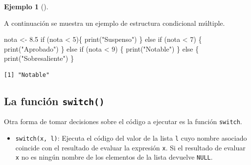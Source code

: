 \documentclass[
  a4paper,
]{scrreport}
\newenvironment{Shaded}{\begin{snugshade}}{\end{snugshade}}
\newcommand{\ControlFlowTok}[1]{\textcolor[rgb]{0.00,0.23,0.31}{#1}}
\newcommand{\DecValTok}[1]{\textcolor[rgb]{0.68,0.00,0.00}{#1}}
\newcommand{\FloatTok}[1]{\textcolor[rgb]{0.68,0.00,0.00}{#1}}
\newcommand{\FunctionTok}[1]{\textcolor[rgb]{0.28,0.35,0.67}{#1}}
\newcommand{\NormalTok}[1]{\textcolor[rgb]{0.00,0.23,0.31}{#1}}
\newcommand{\OtherTok}[1]{\textcolor[rgb]{0.00,0.23,0.31}{#1}}
\newcommand{\SpecialCharTok}[1]{\textcolor[rgb]{0.37,0.37,0.37}{#1}}
\newcommand{\StringTok}[1]{\textcolor[rgb]{0.13,0.47,0.30}{#1}}
\providecommand{\tightlist}{%
  \setlength{\itemsep}{0pt}\setlength{\parskip}{0pt}}\usepackage{longtable,booktabs,array}
\theoremstyle{definition}
\newtheorem{example}{Ejemplo}[chapter]
\theoremstyle{definition}
\theoremstyle{remark}
\begin{document}
\leavevmode{}%
\begin{example}[]\label{exm-condicional-multiple}

A continuación se muestra un ejemplo de estructura condicional múltiple.

\begin{Shaded}
\begin{Highlighting}[]
\NormalTok{nota }\OtherTok{\textless{}{-}} \FloatTok{8.5}
\ControlFlowTok{if}\NormalTok{ (nota }\SpecialCharTok{\textless{}} \DecValTok{5}\NormalTok{)\{}
  \FunctionTok{print}\NormalTok{(}\StringTok{"Suspenso"}\NormalTok{)}
\NormalTok{\} }\ControlFlowTok{else} \ControlFlowTok{if}\NormalTok{ (nota }\SpecialCharTok{\textless{}} \DecValTok{7}\NormalTok{) \{}
  \FunctionTok{print}\NormalTok{(}\StringTok{"Aprobado"}\NormalTok{)}
\NormalTok{\} }\ControlFlowTok{else} \ControlFlowTok{if}\NormalTok{ (nota }\SpecialCharTok{\textless{}} \DecValTok{9}\NormalTok{) \{}
  \FunctionTok{print}\NormalTok{(}\StringTok{"Notable"}\NormalTok{)}
\NormalTok{\} }\ControlFlowTok{else}\NormalTok{ \{}
  \FunctionTok{print}\NormalTok{(}\StringTok{"Sobresaliente"}\NormalTok{)}
\NormalTok{\}}
\end{Highlighting}
\end{Shaded}

\begin{verbatim}
[1] "Notable"
\end{verbatim}

\end{example}

\hypertarget{la-funciuxf3n-switch}{%
\subsection{\texorpdfstring{La función
\texttt{switch()}}{La función switch()}}\label{la-funciuxf3n-switch}}

Otra forma de tomar decisiones sobre el código a ejecutar es la función
\texttt{switch}.

\begin{itemize}
\tightlist
\item
  \texttt{switch(x,\ l)}: Ejecuta el código del valor de la lista
  \texttt{l} cuyo nombre asociado coincide con el resultado de evaluar
  la expresión \texttt{x}. Si el resultado de evaluar \texttt{x} no es
  ningún nombre de los elementos de la lista devuelve \texttt{NULL}.
\end{itemize}
\end{document}
